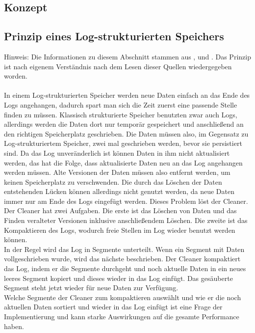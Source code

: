 \documentclass{class/thesis}
\begin{document}
\begin{thesis}
	


	\chapter{Konzept}	
	
	\section{Prinzip eines Log-strukturierten Speichers} \label{Log-struktur_Erklärung}
	
	Hinweis: Die Informationen zu diesem Abschnitt stammen aus \cite{Rosenblum:1992}, \cite{Rumble:FAST14} und \cite{HU:ATC17}. Das Prinzip ist nach eigenem Verständnis nach dem Lesen dieser Quellen wiedergegeben worden.
	\\
	\\
	In einem Log-strukturierten Speicher werden neue Daten einfach an das Ende des Logs angehangen, dadurch spart man sich die Zeit zuerst eine passende Stelle finden zu müssen. Klassisch strukturierte Speicher benutzten zwar auch Logs, allerdings werden die Daten dort nur temporär gespeichert und anschließend an den richtigen Speicherplatz geschrieben. Die Daten müssen also, im Gegensatz zu Log-strukturiertem Speicher, zwei mal geschrieben werden, bevor sie persistiert sind.
	Da das Log unveränderlich ist können Daten in ihm nicht aktualisiert werden, das hat die Folge, dass aktualisierte Daten neu an das Log angehangen werden müssen. Alte Versionen der Daten müssen also entfernt werden, um keinen Speicherplatz zu verschwenden. Die durch das Löschen der Daten entstehenden Lücken können allerdings nicht genutzt werden, da neue Daten immer nur am Ende des Logs eingefügt werden.
	Dieses Problem löst der Cleaner. \\
	Der Cleaner hat zwei Aufgaben. Die erste ist das Löschen von Daten und das Finden veralteter Versionen inklusive anschließendem Löschen. Die zweite ist das Kompaktieren des Logs, wodurch freie Stellen im Log wieder benutzt werden können. \\
	In der Regel wird das Log in Segmente unterteilt. Wenn ein Segment mit Daten vollgeschrieben wurde, wird das nächste beschrieben. Der Cleaner kompaktiert das Log, indem er die Segmente durchgeht und noch aktuelle Daten in ein neues leeres Segment kopiert und dieses wieder in das Log einfügt. Das gesäuberte Segment steht jetzt wieder für neue Daten zur Verfügung. \\
	Welche Segmente der Cleaner zum kompaktieren auswählt und wie er die noch aktuellen Daten sortiert und wieder in das Log einfügt ist eine Frage der Implementierung und kann starke Auswirkungen auf die gesamte Performance haben.
	

\end{thesis}
\end{document}
